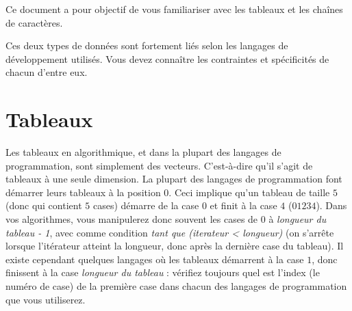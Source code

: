 \documentclass[11pt,a4paper]{article}
\begin{document}
\EncadreTitre

\bigskip


%
%

\bigskip


Ce document a pour objectif de vous familiariser avec les tableaux et les chaînes de caractères.

\bigskip

Ces deux types de données sont fortement liés selon les langages de développement utilisés.
Vous devez connaître les contraintes et spécificités de chacun d'entre eux.


\bigskip


\section{Tableaux}

\bigskip

Les tableaux en algorithmique, et dans la plupart des langages de programmation, sont simplement des vecteurs.
C'est-à-dire qu'il s'agit de tableaux à une seule dimension.
La plupart des langages de programmation font démarrer leurs tableaux à la position $ 0 $.
Ceci implique qu'un tableau de taille $ 5 $ (donc qui contient $ 5 $ cases) démarre de la case $ 0 $ et finit à la case $ 4 $ ($ 0 1 2 3 4 $).
Dans vos algorithmes, vous manipulerez donc souvent les cases de $ 0 $ à \textit{longueur du tableau - 1}, avec comme condition \textit{tant que (iterateur < longueur)} (on s'arrête lorsque l'itérateur atteint la longueur, donc après la dernière case du tableau).
Il existe cependant quelques langages où les tableaux démarrent à la case $ 1 $, donc finissent à la case \textit{longueur du tableau} : vérifiez toujours quel est l'index (le numéro de case) de la première case dans chacun des langages de programmation que vous utiliserez.
\end{document}
